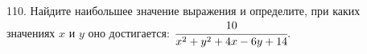 110. Найдите наибольшее значение выражения и определите, при каких значениях $x$ и $y$ оно достигается: $\cfrac{10}{x^2+y^2+4x-6y+14}.$\\
